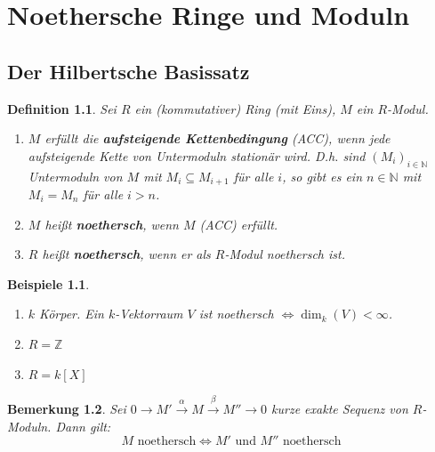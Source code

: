 \documentclass[a4paper,12pt]{scrbook}
\theoremstyle{break}
\newtheorem{Def}{Definition}[chapter]
\newtheorem{Bem}[Def]{Bemerkung}
\theoremstyle{nonumberbreak}
\newtheorem{nnBsp}{Beispiele}
\theoremstyle{nonumberplain}
\newcommand{\emp}[1]{\textbf{\emph{#1}}}
\begin{document}
\chapter{Noethersche Ringe und Moduln}

\section{Der Hilbertsche Basissatz}

\begin{Def}
  Sei $R$ ein (kommutativer) Ring (mit Eins), $M$ ein $R$-Modul.
  \begin{enumerate}
    \item $M$ erfüllt die \emp{aufsteigende Kettenbedingung} (ACC), wenn jede
          aufsteigende Kette von Untermoduln stationär wird. D.h. sind
          $(M_i)_{i \in \mathbb{N}}$ Untermoduln von $M$ mit $M_i \subseteq 
          M_{i+1}$ für alle $i$, so gibt es ein $n \in \mathbb{N}$ mit $M_i =
          M_n$ für alle $i > n$.
    \item $M$ heißt \emp{noethersch}, wenn $M$ (ACC) erfüllt.
    \item $R$ heißt \emp{noethersch}, wenn er als $R$-Modul noethersch ist.
\end{enumerate}
\end{Def}

\begin{nnBsp}
  \begin{enumerate}
    \item[1.)] $k$ Körper. Ein $k$-Vektorraum $V$ ist noethersch $\Leftrightarrow \dim_k(V) < \infty$. 
    \item[2.)] $R = \mathbb{Z}$ 
    \item[3.)] $R = k[X]$  
  \end{enumerate}
\end{nnBsp}

\begin{Bem}
\label{2.2}
  Sei $0 \to M' \overset{\alpha}{\to} M \overset{\beta}{\to} M'' \to 0$ kurze
  exakte Sequenz von $R$-Moduln. Dann gilt:
  \[M \mbox{ noethersch} \Leftrightarrow M' \mbox{ und } M'' \mbox{ noethersch}\]
\end{Bem}
\end{document}
